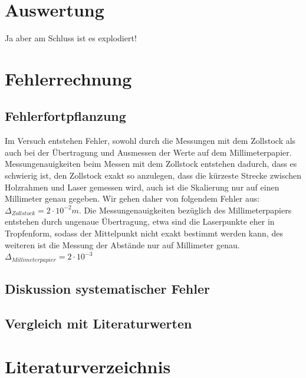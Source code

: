 \documentclass[12pt,a4paper,titlepage,headinclude,bibtotoc]{scrartcl}
\begin{document}
\section{Auswertung}

Ja aber am Schluss ist es explodiert!

\section{Fehlerrechnung}
\subsection{Fehlerfortpflanzung}
Im Versuch entstehen Fehler, sowohl durch die Messungen mit dem Zollstock als auch bei der Übertragung und Ausmessen der Werte auf dem Millimeterpapier. Messungenauigkeiten beim Messen mit dem Zollstock entstehen dadurch, dass es schwierig ist, den Zollstock exakt so anzulegen, dass die kürzeste Strecke zwischen Holzrahmen und Laser gemessen wird, auch ist die Skalierung nur auf einen Millimeter genau gegeben. Wir gehen daher von folgendem Fehler aus: $\Delta_{Zollstock}={2} \cdot{10^{-2}}m$. Die Messungenauigkeiten bezüglich des Millimeterpapiers entstehen durch ungenaue Übertragung, etwa sind die Laserpunkte eher in Tropfenform, sodass der Mittelpunkt nicht exakt bestimmt werden kann, des weiteren ist die Messung der Abstände nur auf Millimeter genau. $\Delta_{Millimeterpapier}={2} \cdot {10^{-3}}$

    

\subsection{Diskussion systematischer Fehler}



\subsection{Vergleich mit Literaturwerten}

\section{Literaturverzeichnis}


\end{document}
